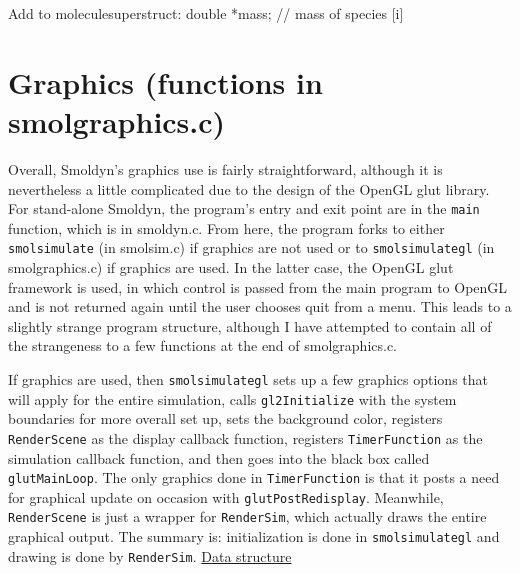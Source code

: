 \documentclass {scrbook}
\newcommand {\ttt} {\texttt}
\begin{document}
Add to moleculesuperstruct:
	double *mass;						// mass of species [i]


\section{Graphics (functions in smolgraphics.c)}

Overall, Smoldyn's graphics use is fairly straightforward, although it is nevertheless a little complicated due to the design of the OpenGL glut library. For stand-alone Smoldyn, the program's entry and exit point are in the \ttt{main} function, which is in smoldyn.c. From here, the program forks to either \ttt{smolsimulate} (in smolsim.c) if graphics are not used or to \ttt{smolsimulategl} (in smolgraphics.c) if graphics are used. In the latter case, the OpenGL glut framework is used, in which control is passed from the main program to OpenGL and is not returned again until the user chooses quit from a menu. This leads to a slightly strange program structure, although I have attempted to contain all of the strangeness to a few functions at the end of smolgraphics.c.

If graphics are used, then \ttt{smolsimulategl} sets up a few graphics options that will apply for the entire simulation, calls \ttt{gl2Initialize} with the system boundaries for more overall set up, sets the background color, registers \ttt{RenderScene} as the display callback function, registers \ttt{TimerFunction} as the simulation callback function, and then goes into the black box called \ttt{glutMainLoop}. The only graphics done in \ttt{TimerFunction} is that it posts a need for graphical update on occasion with \ttt{glutPostRedisplay}. Meanwhile, \ttt{RenderScene} is just a wrapper for \ttt{RenderSim}, which actually draws the entire graphical output. The summary is: initialization is done in \ttt{smolsimulategl} and drawing is done by \ttt{RenderSim}.
\newline
\newline
\underline{Data structure}
\end{document}
